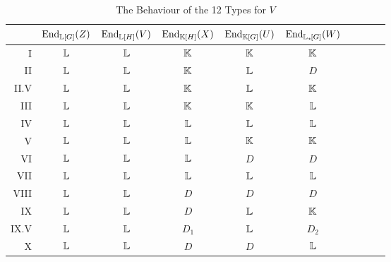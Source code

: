 \begin{table}[p] %
    \vspace{7cm}
\centering
\bgroup
\caption{The Behaviour of the 12 Types for $V$}
\label{tab:12types}
\def\arraystretch{1.1}
\begin{tabular}{r c c c c c c c c c}
    \toprule
    & $\End_{\bL[G]}(Z)$ & $\End_{\bL[H]}(V)$ & $\End_{\bK[H]}(X)$ & $\End_{\bK[G]}(U)$ & $\End_{\bL_{\star \hspace{-0.1em}}[G]}(W)$ \\
    \midrule
I  & $\bL$ & $\bL$ & $\bK$ & $\bK$ & $\bK$ \\
II  & $\bL$ & $\bL$ & $\bK$ & $\bL$ & $D$ \\
II.V  & $\bL$ & $\bL$ & $\bK$ & $\bL$ & $\bK$ \\
III  & $\bL$ & $\bL$ & $\bK$ & $\bK$ & $\bL$ \\ 
IV & $\bL$ & $\bL$ & $\bL$ & $\bL$ & $\bL$ \\ 
V & $\bL$ & $\bL$ & $\bL$ & $\bK$ & $\bK$ \\ 
VI & $\bL$ & $\bL$ & $\bL$ & $D$ & $D$ \\ 
VII & $\bL$ & $\bL$ & $\bL$ & $\bL$ & $\bL$ \\ 
VIII & $\bL$ & $\bL$ & $D$ & $D$ & $D$ \\ 
IX & $\bL$ & $\bL$ & $D$ & $\bL$ & $\bK$ \\ 
IX.V & $\bL$ & $\bL$ & $D_1$ & $\bL$ & $D_2$ \\ 
X & $\bL$ & $\bL$ & $D$ & $D$ & $\bL$ \\
\bottomrule
\end{tabular}
\egroup
\end{table}
